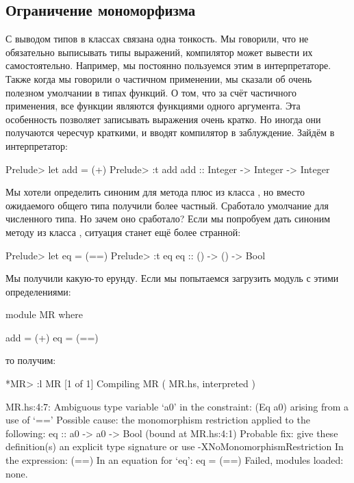 \subsection{Ограничение мономорфизма}

С выводом типов в классах связана одна тонкость. 
Мы говорили, что не обязательно выписывать типы выражений,
компилятор может вывести их самостоятельно. Например, 
мы постоянно пользуемся этим в интерпретаторе.
Также когда мы говорили о частичном применении,
мы сказали об очень полезном умолчании в типах функций.
О том, что за счёт частичного применения, все функции 
являются функциями одного аргумента. Эта особенность
позволяет записывать выражения очень кратко. Но иногда
они получаются чересчур краткими, и вводят компилятор
в заблуждение. Зайдём в интерпретатор:

\begin{code}
Prelude> let add = (+)
Prelude> :t add
add :: Integer -> Integer -> Integer
\end{code}

Мы хотели определить синоним для метода плюс из класса ,
но вместо ожидаемого общего типа получили более частный. 
Сработало умолчание для численного типа. Но зачем оно сработало?
Если мы попробуем дать синоним методу из класса ,
ситуация станет ещё более странной:

\begin{code}
Prelude> let eq = (==)
Prelude> :t eq
eq :: () -> () -> Bool
\end{code}

Мы получили какую-то ерунду. Если мы попытаемся загрузить 
модуль с этими определениями:

\begin{code}
module MR where

add = (+)
eq  = (==)
\end{code}

\noindent то получим:

\begin{code}
*MR> :l MR
[1 of 1] Compiling MR               ( MR.hs, interpreted )

MR.hs:4:7:
    Ambiguous type variable `a0' in the constraint:
      (Eq a0) arising from a use of `=='
    Possible cause: the monomorphism restriction applied to the following:
      eq :: a0 -> a0 -> Bool (bound at MR.hs:4:1)
    Probable fix: give these definition(s) an explicit type signature
                  or use -XNoMonomorphismRestriction
    In the expression: (==)
    In an equation for `eq': eq = (==)
Failed, modules loaded: none.
\end{code}

